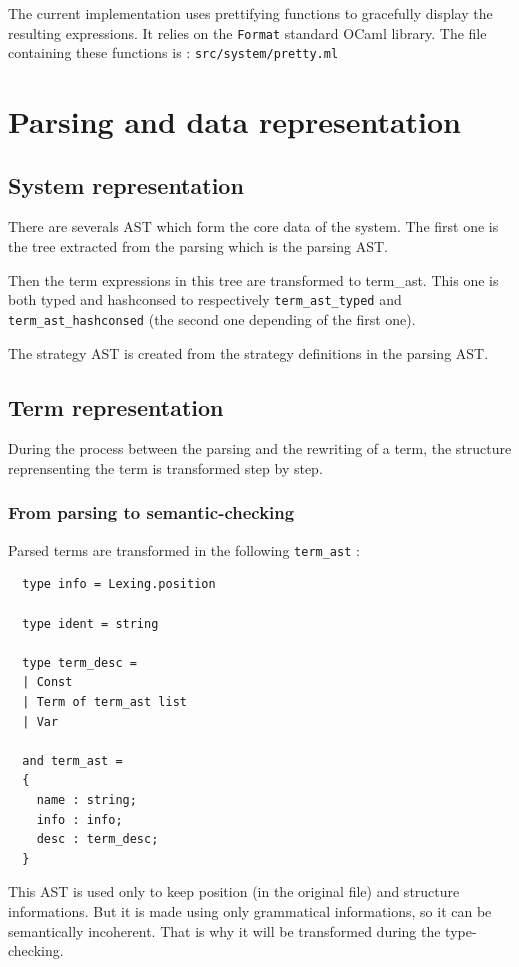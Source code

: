 \documentclass[12pt,a4paper]{article}
\begin{document}
The current implementation uses prettifying functions to gracefully
display the resulting expressions. It relies on the \verb?Format?
standard OCaml library. The file containing these functions is :
\verb?src/system/pretty.ml?

\section{Parsing and data representation}
\label{data}

\subsection{System representation}
\label{data-system}

There are severals AST which form the core data of the system. The
first one is the tree extracted from the parsing which is the parsing
AST.

Then the term expressions in this tree are transformed to
term_ast. This one is both typed and hashconsed to respectively
\texttt{term_ast_typed} and \texttt{term_ast_hashconsed} (the second
one depending of the first one).

The strategy AST is created from the strategy definitions in the
parsing AST.

\subsection{Term representation}
\label{data-term}
During the process between the parsing and the rewriting of a term, the
structure reprensenting the term is transformed step by step.

\subsubsection{From parsing to semantic-checking}
Parsed terms are transformed in the following \verb?term_ast? :
\begin{lstlisting}
  type info = Lexing.position

  type ident = string

  type term_desc =
  | Const
  | Term of term_ast list
  | Var

  and term_ast =
  {
    name : string;
    info : info;
    desc : term_desc;
  }
\end{lstlisting}

This AST is used only to keep position (in the original file) and structure
informations.
But it is made using only grammatical informations, so it can be
semantically incoherent. That is why it will be transformed during the
type-checking.
\end{document}
